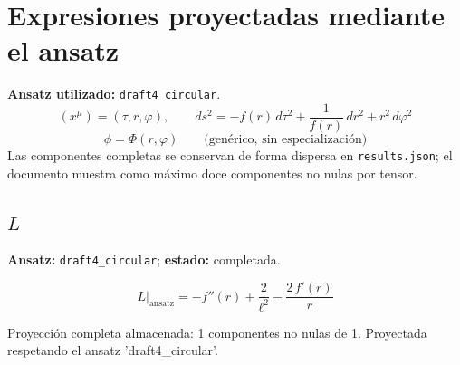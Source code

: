 \documentclass[11pt]{article}
\begin{document}
\section*{Expresiones proyectadas mediante el ansatz}
\textbf{Ansatz utilizado:} \texttt{draft4\_circular}.
\begin{dmath*}[breakdepth={3}]
(x^\mu)=\left(\tau, r, \varphi\right),\qquad ds^2 = -f\!\left(r\right)\,d\tau^2 + \frac{1}{f\!\left(r\right)}\,dr^2 + {r}^{2}\,d\varphi^2
\end{dmath*}
\begin{dmath*}[breakdepth={3}]
\phi = \Phi\!\left(r, \varphi\right)\qquad\text{(genérico, sin especialización)}
\end{dmath*}
Las componentes completas se conservan de forma dispersa en \texttt{results.json}; el documento muestra como máximo doce componentes no nulas por tensor.
\subsection*{$ L $}
\textbf{Ansatz:} \texttt{draft4\_circular}; \textbf{estado:} completada.\par
\begin{dmath*}[breakdepth={5}]
L\big|_{\mathrm{ansatz}} = -f''\!\left(r\right) + \frac{2}{{\ell}^{2}} - \frac{2\,f'\!\left(r\right)}{r}
\end{dmath*}
\par\smallskip
Proyección completa almacenada: 1 componentes no nulas de 1. Proyectada respetando el ansatz 'draft4\_circular'.\par\medskip
{}
\end{document}
